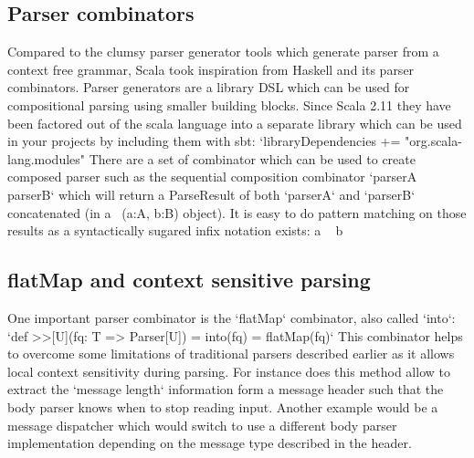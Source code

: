 \subsection{Parser combinators}
Compared to the clumsy parser generator tools which generate parser from a context free grammar, Scala took inspiration from Haskell and its parser combinators. Parser generators are a library DSL which can be used for compositional parsing using smaller building blocks.
Since Scala 2.11 they have been factored out of the scala language into a separate library which can be used in your projects by including them with sbt:
`libraryDependencies += "org.scala-lang.modules" %
There are a set of combinator which can be used to create composed parser such as the sequential composition combinator `parserA ~ parserB` which will return a ParseResult of both `parserA` and `parserB` concatenated (in a ~(a:A, b:B) object). It is easy to do pattern matching on those results as a syntactically sugared infix notation exists: a ~ b

\subsection{flatMap and context sensitive parsing}
One important parser combinator is the `flatMap` combinator, also called `into`:
`def >>[U](fq: T => Parser[U]) = into(fq) = flatMap(fq)`
This combinator helps to overcome some limitations of traditional parsers described earlier as it allows local context sensitivity during parsing. For instance does this method allow to extract the `message length` information form a message header such that the body parser knows when to stop reading input. Another example would be a message dispatcher which would switch to use a different body parser implementation depending on the message type described in the header.
